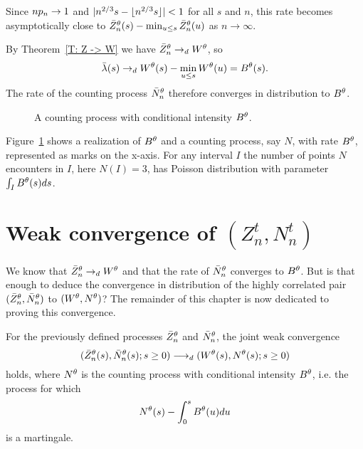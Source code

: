 Since $np_n \rightarrow 1$ and $|n^{2 / 3}s - \lfloor n^{2 / 3}s\rfloor| < 1$ for all $s$ and $n$,
this rate becomes asymptotically close to $\bar{Z}^{\theta}_n(s) - \min_{u \leq s}\bar{Z}^{\theta}_n(u)$ as $n \rightarrow \infty$.

By Theorem~\ref{T: Z -> W} we have $\bar{Z}^{\theta}_n \rightarrow_d W^{\theta}$,
so
\begin{equation}
\bar{\lambda}(s) \rightarrow_d W^{\theta}(s) - \min_{u \leq s}W^{\theta}(u) = B^{\theta}(s).
\end{equation}
The rate of the counting process $\bar{N}_n^{\theta}$ therefore converges in distribution to $B^{\theta}$.

\begin{figure}[ht]
	\centering
	
	\caption{A counting process with conditional intensity $B^{\theta}$.} 
	\label{F: area points}
\end{figure}

Figure~\ref{F: area points} shows a realization of $B^{\theta}$ and a counting process, say $N$, with rate $B^{\theta}$,
represented as marks on the x-axis.
For any interval $I$ the number of points $N$ encounters in $I$, here $N(I) = 3$, 
has Poisson distribution with parameter $\int_{I}B^{\theta}(s)ds$.


\section{Weak convergence of $(Z^t_n, N^t_n)$}

We know that $\bar{Z}^{\theta}_n \rightarrow_d W^{\theta}$ and that the rate of $\bar{N}_n^{\theta}$ converges to $B^{\theta}$.
But is that enough to deduce the convergence in distribution of the highly correlated pair $(\bar{Z}^{\theta}_n, \bar{N}_n^{\theta})$ to $(W^{\theta}, N^{\theta})$?
The remainder of this chapter is now dedicated to proving this convergence.


\begin{theorem} \label{T: Joint Convergence}
	For the previously defined processes $\bar{Z}^{\theta}_n$ and $\bar{N}_n^{\theta}$,
	the joint weak convergence
	\begin{equation}
	( \bar{Z}^{\theta}_n(s), \bar{N}_n^{\theta}(s); s \geq 0 ) \longrightarrow_d (W^{\theta}(s), N^{\theta}(s); s \geq 0)
	\end{equation}
	holds, where $N^{\theta}$ is the counting process with conditional intensity $B^{\theta}$,
	i.e. the process for which
	\begin{equation*}
	N^{\theta}(s) - \int_{0}^s B^{\theta}(u)du
	\end{equation*}
	is a martingale.
\end{theorem}

